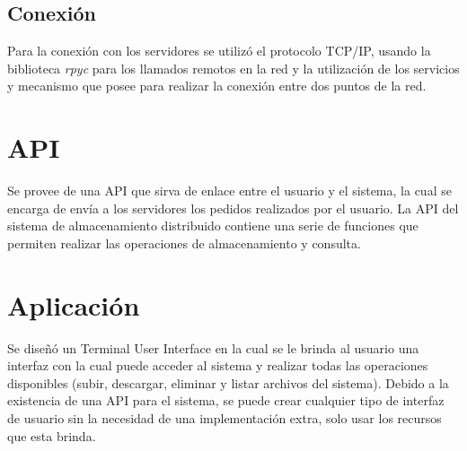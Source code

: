 \documentclass[12pt]{article}
\begin{document}
    \subsection{Conexión}
        Para la conexión con los servidores se utilizó el protocolo TCP/IP,
        usando la biblioteca \emph{rpyc} para los llamados remotos en la red y
        la utilización de los servicios y mecanismo que posee para realizar la
        conexión entre dos puntos de la red.

    \section{API}
        Se provee de una API que sirva de enlace entre el usuario y el sistema,
        la cual se encarga de envía a los servidores los pedidos realizados por
        el usuario. La API del sistema de almacenamiento distribuido contiene
        una serie de funciones que permiten realizar las operaciones de
        almacenamiento y consulta.

    \section{Aplicación}

        Se diseñó un Terminal User Interface en la cual se le brinda al usuario
        una interfaz con la cual puede acceder al sistema y realizar todas las
        operaciones disponibles (subir, descargar, eliminar y listar archivos del
        sistema).
        Debido a la existencia de una API para el sistema, se puede crear
        cualquier tipo de interfaz de usuario sin la necesidad de una implementación
        extra, solo usar los recursos que esta brinda.
\end{document}
